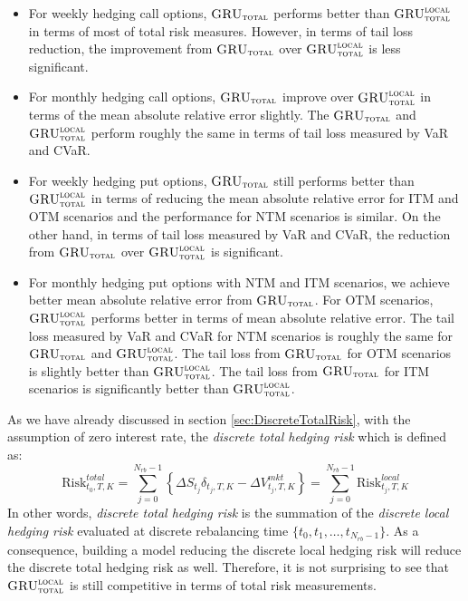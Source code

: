 \documentclass[letterpaper,12pt,titlepage,oneside,final]{book}
\numberwithin{equation}{section}
\theoremstyle{definition}
\newcommand{\modelT}{\textsc{GRU}_{\textsc{total}}}
\newcommand{\modelL}{\textsc{GRU}_{\textsc{total}}^{\textsc{local}}}
\newcommand{\Vmkt}{V^{mkt}}
\newcommand{\Smkt}{S}
\begin{document}
\begin{itemize}
	\item For weekly hedging call options, $\modelT$ performs better than $\modelL$ in terms of most of total risk measures. However, in terms of tail loss reduction, the improvement from $\modelT$ over   $\modelL$ is less significant.
	\item For monthly hedging call options, $\modelT$ improve over $\modelL$ in terms of  the mean absolute relative error slightly.  The $\modelT$ and $\modelL$ perform roughly the same in terms of tail loss measured by VaR and CVaR.
	\item For weekly hedging put options, $\modelT$ still performs better than $\modelL$ in terms of reducing the mean absolute relative error for ITM and OTM scenarios and the performance for NTM scenarios is similar. On the other hand, in terms of tail loss measured by VaR and CVaR, the reduction from $\modelT$ over $\modelL$ is significant.
	\item For monthly hedging put options with NTM and ITM scenarios, we achieve better  mean absolute relative error from $\modelT$. For OTM scenarios,   $\modelL$ performs better in terms of mean absolute relative error. The tail loss measured by VaR and CVaR for NTM scenarios is roughly the same for $\modelT$ and $\modelL$. The tail loss from $\modelT$ for OTM scenarios is slightly better than $\modelL$. The tail loss from $\modelT$ for ITM scenarios is significantly better than $\modelL$.
\end{itemize}

As we have already discussed in section \ref{sec:DiscreteTotalRisk}, with the assumption of zero interest rate, the {\em discrete total hedging risk} which is defined as:
\begin{equation}
\text{Risk}^{total}_{t_0,T,K}=\sum_{j=0}^{N_{rb}-1}\left\{ \Delta \Smkt_{t_j} \delta_{t_j,T,K} -\Delta \Vmkt_{t_j,T,K} \right\}=\sum_{j=0}^{N_{rb}-1}\text{Risk}^{local}_{t_j,T,K}
\end{equation}
In other words, {\em discrete total hedging risk} is the summation of the {\em discrete local hedging risk} evaluated at discrete rebalancing time $\{t_0,t_1,\dots,t_{N_{rb}-1}\}$. As a consequence, building a model reducing the discrete local hedging risk will reduce the discrete total hedging risk as well. Therefore, it is not surprising to see that $\modelL$ is still competitive in terms of total risk measurements.


\fi
\end{document}
